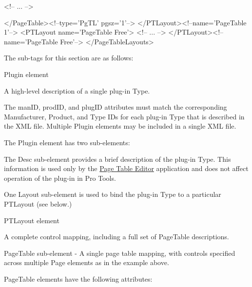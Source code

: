 \begin{DoxyCode}
            <!--    ... -->             
            
        </PageTable><!--type=\textcolor{stringliteral}{'PgTL'} pgsz=\textcolor{charliteral}{'1'}-->
    </PTLayout><!--name=\textcolor{stringliteral}{'PageTable 1'}-->
    <PTLayout name=\textcolor{stringliteral}{'PageTable Free'}>
        <!--     ...     -->
    </PTLayout><!--name=\textcolor{stringliteral}{'PageTable Free'}-->
</PageTableLayouts>
\end{DoxyCode}


The sub-\/tags for this section are as follows\+:


\begin{DoxyItemize}
\item {\ttfamily Plugin} element 

A high-\/level description of a single plug-\/in Type.

The {\ttfamily man\+I\+D}, {\ttfamily prod\+I\+D}, and {\ttfamily plug\+I\+D} attributes must match the corresponding Manufacturer, Product, and Type I\+Ds for each plug-\/in Type that is described in the X\+M\+L file. Multiple {\ttfamily Plugin} elements may be included in a single X\+M\+L file.

The {\ttfamily Plugin} element has two sub-\/elements\+:


\begin{DoxyEnumerate}
\item The {\ttfamily Desc} sub-\/element provides a brief description of the plug-\/in Type. This information is used only by the \hyperlink{a00363_subsection_creating_page_tables_in_pete}{Page Table Editor} application and does not affect operation of the plug-\/in in Pro Tools.  
\item One {\ttfamily Layout} sub-\/element is used to bind the plug-\/in Type to a particular {\ttfamily P\+T\+Layout} (see below.)  
\end{DoxyEnumerate}


\item {\ttfamily P\+T\+Layout} element 

A complete control mapping, including a full set of {\ttfamily Page\+Table} descriptions.


\begin{DoxyItemize}
\item {\ttfamily Page\+Table} sub-\/element -\/ A single page table mapping, with controls specified across multiple {\ttfamily Page} elements as in the example above.

{\ttfamily Page\+Table} elements have the following attributes\+:



\end{DoxyItemize}
\end{DoxyItemize}

